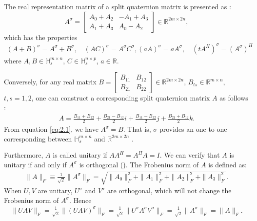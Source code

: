\documentclass[3p]{elsarticle}
\numberwithin{equation}{section}
\begin{document}
The real representation matrix of a split quaternion matrix is presented as \cite{Gang2024}:
\begin{equation}\label{eq:2.1}
{A}^\sigma = \begin{bmatrix} A_0 + A_2 & -A_1 + A_3 \\ A_1 + A_3 & A_0 - A_2 \end{bmatrix} \in \mathbb{R}^{2m \times 2n},
\end{equation}
which has the properties
\begin{equation}\label{eq:2.2}
\begin{aligned}
    (A + B)^\sigma = A^\sigma + B^\sigma, \quad (AC)^\sigma = A^\sigma C^\sigma, 
    (a A)^\sigma = a A^\sigma, \quad (tA^H)^\sigma = (A^\sigma)^H
\end{aligned}
\end{equation}
where $A, B \in \mathbb{H}_s^{m \times n}$, $C \in \mathbb{H}_s^{n \times p}$, $a \in \mathbb{R}$. 

Conversely, for any real matrix $B = \begin{bmatrix} B_{11} & B_{12} \\ B_{21} & B_{22} \end{bmatrix} \in \mathbb{R}^{2m \times 2n}$, $B_{ts} \in \mathbb{R}^{m \times n}$, $t, s = 1, 2$, one can construct a corresponding split quaternion matrix $A$ as follows \cite{TJiang2015}:
\begin{equation}\label{eq:2.3}
    \begin{aligned}
    A = \frac{B_{11} + B_{22}}{2} + \frac{B_{21} - B_{12}}{2}i 
        + \frac{B_{11} - B_{22}}{2}j + \frac{B_{21} + B_{12}}{2}k.
    \end{aligned}
    \end{equation}
From equation \eqref{eq:2.1}, we have ${A}^\sigma = B$. 
That is,  $\sigma$ provides an one-to-one corresponding between $\mathbb{H}_s^{m\times n}$ and $\mathbb{R}^{2m \times 2n}$ \cite{Gang2024}.

Furthermore,  $A$ is called unitary if $AA^H = A^H A = I$. We can verify that $A$ is unitary if and only if  $A^\sigma$ is  orthogonal (\cite{TJiang2018}).
 The Frobenius norm of $A$ is defined as: 
 \begin{align*}
     \| A \|_F \equiv \frac{1}{\sqrt{2}} \| A^\sigma \|_F = \sqrt{\| A_0 \|_F^2 + \| A_1 \|_F^2 + \| A_2 \|_F^2 + \| A_3 \|_F^2}.
\end{align*}
  When $U, V$ are unitary, $U^\sigma$ and $V^\sigma$ are orthogonal, which will not change the Frobenius norm  of $A^\sigma$. Hence
\begin{align*}
\|UAV\|_F = \frac{1}{\sqrt{2}} \|(UAV)^\sigma\|_F 
= \frac{1}{\sqrt{2}} \|U^\sigma A^\sigma V^\sigma\|_F 
= \frac{1}{\sqrt{2}} \|A^\sigma\|_F 
= \|A\|_F.
\end{align*}
\end{document}
